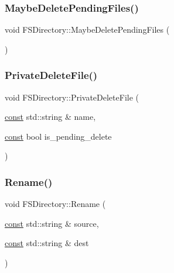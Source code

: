 \subsubsection{\texorpdfstring{Maybe\+Delete\+Pending\+Files()}{MaybeDeletePendingFiles()}}
{\footnotesize\ttfamily void F\+S\+Directory\+::\+Maybe\+Delete\+Pending\+Files (\begin{DoxyParamCaption}{ }\end{DoxyParamCaption})\hspace{0.3cm}{\ttfamily [private]}}

\mbox{\label{classlucene_1_1core_1_1store_1_1FSDirectory_ab679ea582a711d7e79263d0022cbd0d7}} 
\subsubsection{\texorpdfstring{Private\+Delete\+File()}{PrivateDeleteFile()}}
{\footnotesize\ttfamily void F\+S\+Directory\+::\+Private\+Delete\+File (\begin{DoxyParamCaption}\item[{\mbox{\hyperlink{ZlibCrc32_8h_a2c212835823e3c54a8ab6d95c652660e}{const}} std\+::string \&}]{name,  }\item[{\mbox{\hyperlink{ZlibCrc32_8h_a2c212835823e3c54a8ab6d95c652660e}{const}} bool}]{is\+\_\+pending\+\_\+delete }\end{DoxyParamCaption})\hspace{0.3cm}{\ttfamily [private]}}

\mbox{\label{classlucene_1_1core_1_1store_1_1FSDirectory_a28b5eecd955057c16fc3c8c94654bc5f}} 
\subsubsection{\texorpdfstring{Rename()}{Rename()}}
{\footnotesize\ttfamily void F\+S\+Directory\+::\+Rename (\begin{DoxyParamCaption}\item[{\mbox{\hyperlink{ZlibCrc32_8h_a2c212835823e3c54a8ab6d95c652660e}{const}} std\+::string \&}]{source,  }\item[{\mbox{\hyperlink{ZlibCrc32_8h_a2c212835823e3c54a8ab6d95c652660e}{const}} std\+::string \&}]{dest }\end{DoxyParamCaption})\hspace{0.3cm}{\ttfamily [virtual]}}



